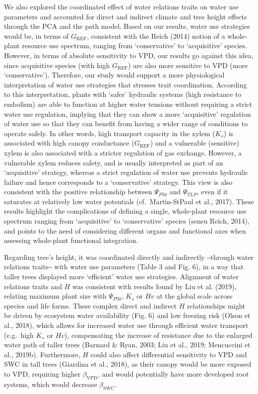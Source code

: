 \documentclass[11pt,twoside]{reedthesis}
\begin{document}
We also explored the coordinated effect of water relations traits on
water use parameters and accounted for direct and indirect climate and
tree height effects through the PCA and the path model. Based on our
results, water use strategies would be, in terms of \(G_{\text{REF}}\),
consistent with the Reich (2014) notion of a whole-plant resource use
spectrum, ranging from `conservative' to `acquisitive' species. However,
in terms of absolute sensitivity to VPD, our results go against this
idea, since acquisitive species (with high \(G_{\text{REF}}\)) are also
more sensitive to VPD (more `conservative'). Therefore, our study would
support a more physiological interpretation of water use strategies that
stresses trait coordination. According to this interpretation, plants
with `safer' hydraulic systems (high resistance to embolism) are able to
function at higher water tensions without requiring a strict water use
regulation, implying that they can show a more `acquisitive' regulation
of water use so that they can benefit from having a wider range of
conditions to operate safely. In other words, high transport capacity in
the xylem (\(K_s\)) is associated with high canopy conductance
(\(G_{\text{REF}}\)) and a vulnerable (sensitive) xylem is also
associated with a stricter regulation of gas exchange. However, a
vulnerable xylem reduces safety, and is usually interpreted as part of
an `acquisitive' strategy, whereas a strict regulation of water use
prevents hydraulic failure and hence corresponds to a `conservative'
strategy. This view is also consistent with the positive relationship
between \(\Psi_{P50}\) and \(\Psi_{TLP}\), even if it saturates at
relatively low water potentials (cf.~Martin-StPaul et al., 2017). These
results highlight the complications of defining a single, whole-plant
resource use spectrum ranging from `acquisitive' to `conservative'
species (sensu Reich, 2014), and points to the need of considering
different organs and functional axes when assessing whole-plant
functional integration.\par

Regarding tree's height, it was coordinated directly and indirectly
‒through water relations traits‒ with water use parameters (Table 3 and
Fig. 6), in a way that taller trees displayed more `efficient' water use
strategies. Alignment of water relations traits and \(H\) was consistent
with results found by Liu et al. (2019), relating maximum plant size
with \(\Psi_{P50}\), \(K_s\) or \(Hv\) at the global scale across
species and life forms. These complex direct and indirect \(H\)
relationships might be driven by ecosystem water availability (Fig. 6)
and low freezing risk (Olson et al., 2018), which allows for increased
water use through efficient water transport (e.g.~high \(K_s\) or
\(Hv\)), compensating the increase of resistance due to the enlarged
water path of taller trees (Barnard \& Ryan, 2003; Liu et al., 2019;
Mencuccini et al., 2019b). Furthermore, \(H\) could also affect
differential sensitivity to VPD and SWC in tall trees (Giardina et al.,
2018), as their canopy would be more exposed to VPD, requiring higher
\(\beta_{\text{VPD}}\), and would potentially have more developed root
systems, which would decrease \(\beta_{\text{SWC}}\).\par
\end{document}
